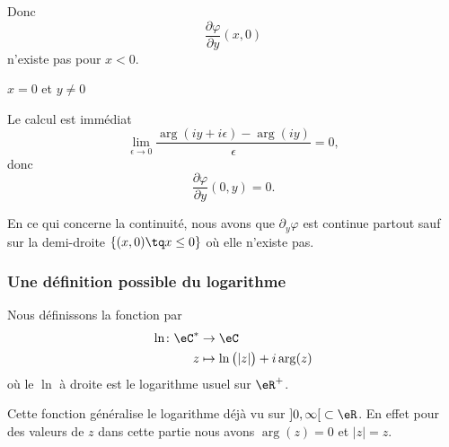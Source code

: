 \begin{normaltext}
\begin{subproof}
            Donc
            \begin{equation}
                \frac{ \partial \varphi }{ \partial y }(x,0)
            \end{equation}
            n'existe pas pour \( x<0\).

        \item[\( x=0\) et \( y\neq 0\)]

            Le calcul est immédiat
            \begin{equation}
                \lim_{\epsilon\to 0}\frac{ \arg(iy+i\epsilon)-\arg(iy) }{ \epsilon }=0,
            \end{equation}
            donc
            \begin{equation}
                \frac{ \partial \varphi }{ \partial y }(0,y)=0.
            \end{equation}
            

    \end{subproof}
    En ce qui concerne la continuité, nous avons que \( \partial_y\varphi\) est continue partout sauf sur la demi-droite \(  \{ (x,0)\tq x\leq 0 \}   \) où elle n'existe pas.

\end{normaltext}

\subsubsection{Une définition possible du logarithme}

\begin{definition}      \label{DEFooWDYNooYIXVMC}
    Nous définissons la fonction  par
    \begin{equation}
        \begin{aligned}
            \ln\colon \eC^*&\to \eC \\
            z&\mapsto \ln\big( | z | \big)+i\arg(z)
        \end{aligned}
    \end{equation}
    où le \( \ln\) à droite est le logarithme usuel sur \( \eR^+\).
\end{definition}

\begin{remark}
Cette fonction généralise le logarithme déjà vu sur \( \mathopen] 0 , \infty \mathclose[\subset \eR\). En effet pour des valeurs de \( z\) dans cette partie nous avons \( \arg(z)=0\) et \( | z |=z\).
\end{remark}

